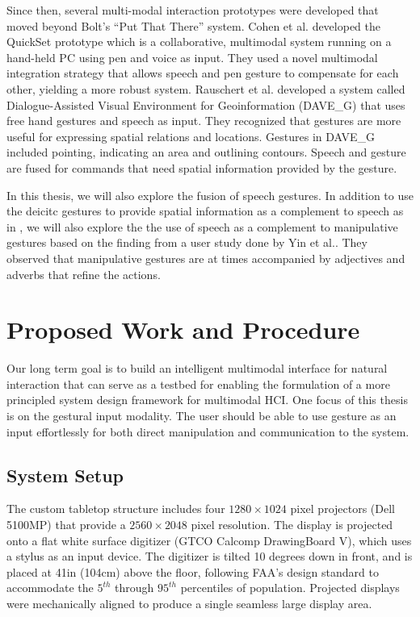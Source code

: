 Since then, several multi-modal interaction prototypes were 
developed that moved beyond Bolt's ``Put That There'' system. Cohen et al. 
\cite{Cohen97} developed the QuickSet prototype which is a collaborative, 
multimodal system running on a hand-held PC using pen and voice as input. They 
used a novel multimodal integration strategy that allows speech and pen gesture 
to compensate for each other, yielding a more robust system. Rauschert et al. 
\cite{Rauschert02} developed a system called Dialogue-Assisted Visual 
Environment for Geoinformation (DAVE\_G) that uses free hand gestures and speech
as input. They recognized that gestures are more useful for expressing spatial 
relations and locations. Gestures in DAVE\_G included pointing, indicating an 
area and outlining contours. Speech and gesture are fused for commands that need
spatial information provided by the gesture. 

In this thesis, we will also explore the fusion of speech gestures. In addition
to use the deicitc gestures to provide spatial information as a complement to
speech as in \cite{Rauschert02}, we will also explore the the use of speech as a
complement to manipulative gestures based on the finding from a user study done
by Yin et al.\cite{yin10}. They observed that manipulative gestures are at times
accompanied by adjectives and adverbs that refine the actions.

\section{Proposed Work and Procedure}
Our long term goal is to build an intelligent multimodal interface for natural
interaction that can serve as a testbed for enabling the formulation of a more
principled system design framework for multimodal HCI. One focus of this thesis
is on the gestural input modality. The user should be able to use gesture as an
input effortlessly for both direct manipulation and communication to the system.

\subsection{System Setup}
The custom tabletop structure includes four $1280\times1024$ pixel projectors 
(Dell 5100MP) that provide a $2560\times2048$ pixel resolution. The display is 
projected onto a flat white surface digitizer (GTCO Calcomp DrawingBoard V), 
which uses a stylus as an input device. The digitizer is tilted 10 degrees down 
in front, and is placed at 41in (104cm) above the floor, following FAA's design 
standard to accommodate the $5^{th}$ through $95^{th}$ percentiles of 
population. Projected displays were mechanically aligned to produce a single 
seamless large display area.

